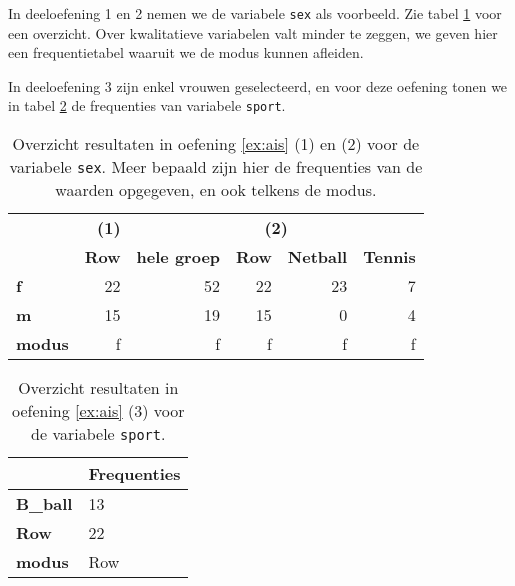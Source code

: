 In deeloefening 1 en 2 nemen we de variabele \texttt{sex} als voorbeeld. Zie tabel \ref{tab:opl-ais-sex} voor een overzicht. Over kwalitatieve variabelen valt minder te zeggen, we geven hier een frequentietabel waaruit we de modus kunnen afleiden.

In deeloefening 3 zijn enkel vrouwen geselecteerd, en voor deze oefening tonen we in tabel \ref{tab:opl-ais-sport} de frequenties van variabele \texttt{sport}.

\begin{table}
  \centering
  \begin{tabular}{@{}l|r|rrrr}
  	\toprule
  	               & \textbf{(1)} &                    \multicolumn{4}{c}{\textbf{(2)}}                     \\
  	               & \textbf{Row} & \textbf{hele groep} & \textbf{Row} & \textbf{Netball} & \textbf{Tennis} \\ \midrule
  	\textbf{f}     &           22 &                  52 &           22 &               23 &               7 \\
  	\textbf{m}     &           15 &                  19 &           15 &                0 &               4 \\
  	\textbf{modus} &            f &                   f &            f &                f &               f \\ \bottomrule
  \end{tabular}
  \caption{Overzicht resultaten in oefening \ref{ex:ais} (1) en (2) voor de variabele \texttt{sex}. Meer bepaald zijn hier de frequenties van de waarden opgegeven, en ook telkens de modus.}
  \label{tab:opl-ais-sex}
\end{table}

\begin{table}
  \centering
  \begin{tabular}{@{}l|l}
  	\toprule
  	                 & Frequenties \\ \midrule
  	\textbf{B\_ball} & 13          \\
  	\textbf{Row}     & 22          \\
  	\textbf{modus}   & Row         \\ \bottomrule
  \end{tabular}
  \caption{Overzicht resultaten in oefening \ref{ex:ais} (3) voor de variabele \texttt{sport}.}
  \label{tab:opl-ais-sport}
\end{table}
